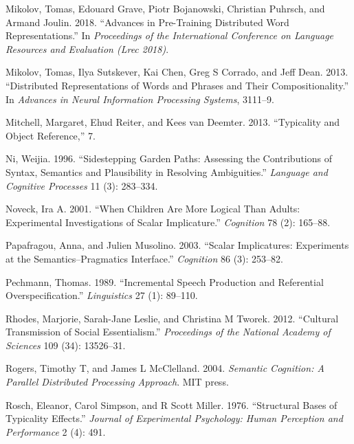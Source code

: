\documentclass{ucetd}
\newlength{\cslhangindent}
\newenvironment{cslreferences}%
{\setlength{\parindent}{0pt}%
\everypar{\setlength{\hangindent}{\cslhangindent}}\ignorespaces}%
{\par}
\begin{document}
\begin{cslreferences}
\leavevmode\hypertarget{ref-mikolov2018}{}%
Mikolov, Tomas, Edouard Grave, Piotr Bojanowski, Christian Puhrsch, and
Armand Joulin. 2018. ``Advances in Pre-Training Distributed Word
Representations.'' In \emph{Proceedings of the International Conference
on Language Resources and Evaluation (Lrec 2018)}.

\leavevmode\hypertarget{ref-mikolov2013}{}%
Mikolov, Tomas, Ilya Sutskever, Kai Chen, Greg S Corrado, and Jeff Dean.
2013. ``Distributed Representations of Words and Phrases and Their
Compositionality.'' In \emph{Advances in Neural Information Processing
Systems}, 3111--9.

\leavevmode\hypertarget{ref-mitchell_2013}{}%
Mitchell, Margaret, Ehud Reiter, and Kees van Deemter. 2013.
``Typicality and Object Reference,'' 7.

\leavevmode\hypertarget{ref-nietal}{}%
Ni, Weijia. 1996. ``Sidestepping Garden Paths: Assessing the
Contributions of Syntax, Semantics and Plausibility in Resolving
Ambiguities.'' \emph{Language and Cognitive Processes} 11 (3): 283--334.

\leavevmode\hypertarget{ref-noveck_when_2001}{}%
Noveck, Ira A. 2001. ``When Children Are More Logical Than Adults:
Experimental Investigations of Scalar Implicature.'' \emph{Cognition} 78
(2): 165--88.

\leavevmode\hypertarget{ref-papafragou_scalar_2003}{}%
Papafragou, Anna, and Julien Musolino. 2003. ``Scalar Implicatures:
Experiments at the Semantics--Pragmatics Interface.'' \emph{Cognition}
86 (3): 253--82.

\leavevmode\hypertarget{ref-pechmann_incremental_1989}{}%
Pechmann, Thomas. 1989. ``Incremental Speech Production and Referential
Overspecification.'' \emph{Linguistics} 27 (1): 89--110.

\leavevmode\hypertarget{ref-rhodes2012}{}%
Rhodes, Marjorie, Sarah-Jane Leslie, and Christina M Tworek. 2012.
``Cultural Transmission of Social Essentialism.'' \emph{Proceedings of
the National Academy of Sciences} 109 (34): 13526--31.

\leavevmode\hypertarget{ref-rogers2004}{}%
Rogers, Timothy T, and James L McClelland. 2004. \emph{Semantic
Cognition: A Parallel Distributed Processing Approach}. MIT press.

\leavevmode\hypertarget{ref-rosch_structural_1976}{}%
Rosch, Eleanor, Carol Simpson, and R Scott Miller. 1976. ``Structural
Bases of Typicality Effects.'' \emph{Journal of Experimental Psychology:
Human Perception and Performance} 2 (4): 491.


\end{cslreferences}
\end{document}
